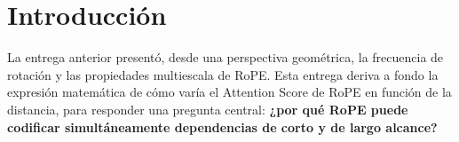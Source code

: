 \section{Introducción}

La entrega anterior presentó, desde una perspectiva geométrica, la frecuencia de rotación y las propiedades multiescala de RoPE. Esta entrega deriva a fondo la expresión matemática de cómo varía el Attention Score de RoPE en función de la distancia, para responder una pregunta central: \textbf{¿por qué RoPE puede codificar simultáneamente dependencias de corto y de largo alcance?}

